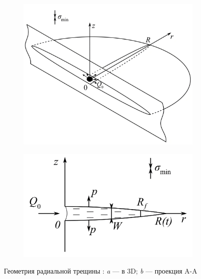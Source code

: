 \begin{figure}[H]
	\begin{subfigure}[t]{\dimexpr.5\linewidth-1.3em\relax}
		\centering
		\includegraphics[width=.95\linewidth,valign=t]{images/radial_model_3D.jpg}
	\end{subfigure}
\hfill %
	\begin{subfigure}[t]{\dimexpr.5\linewidth-1.3em\relax}
		\centering
		\includegraphics[width=.95\linewidth,valign=t]{images/radial_model_A-A_plane.jpg}
	\end{subfigure}
\captionsetup{justification=centering} %
\caption{Геометрия радиальной трещины \cite{esipov}: {\itshape a} --- в 3D; {\itshape b} --- проекция A-A} 
\label{fig:radial-model}
\end{figure}


